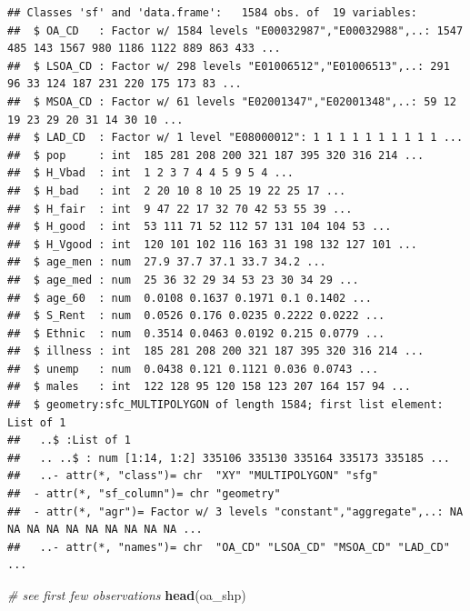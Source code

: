 \documentclass[]{book}
\newenvironment{Shaded}{\begin{snugshade}}{\end{snugshade}}
\newcommand{\CommentTok}[1]{\textcolor[rgb]{0.56,0.35,0.01}{\textit{#1}}}
\newcommand{\KeywordTok}[1]{\textcolor[rgb]{0.13,0.29,0.53}{\textbf{#1}}}
\newcommand{\NormalTok}[1]{#1}
\begin{document}
\begin{verbatim}
## Classes 'sf' and 'data.frame':   1584 obs. of  19 variables:
##  $ OA_CD   : Factor w/ 1584 levels "E00032987","E00032988",..: 1547 485 143 1567 980 1186 1122 889 863 433 ...
##  $ LSOA_CD : Factor w/ 298 levels "E01006512","E01006513",..: 291 96 33 124 187 231 220 175 173 83 ...
##  $ MSOA_CD : Factor w/ 61 levels "E02001347","E02001348",..: 59 12 19 23 29 20 31 14 30 10 ...
##  $ LAD_CD  : Factor w/ 1 level "E08000012": 1 1 1 1 1 1 1 1 1 1 ...
##  $ pop     : int  185 281 208 200 321 187 395 320 316 214 ...
##  $ H_Vbad  : int  1 2 3 7 4 4 5 9 5 4 ...
##  $ H_bad   : int  2 20 10 8 10 25 19 22 25 17 ...
##  $ H_fair  : int  9 47 22 17 32 70 42 53 55 39 ...
##  $ H_good  : int  53 111 71 52 112 57 131 104 104 53 ...
##  $ H_Vgood : int  120 101 102 116 163 31 198 132 127 101 ...
##  $ age_men : num  27.9 37.7 37.1 33.7 34.2 ...
##  $ age_med : num  25 36 32 29 34 53 23 30 34 29 ...
##  $ age_60  : num  0.0108 0.1637 0.1971 0.1 0.1402 ...
##  $ S_Rent  : num  0.0526 0.176 0.0235 0.2222 0.0222 ...
##  $ Ethnic  : num  0.3514 0.0463 0.0192 0.215 0.0779 ...
##  $ illness : int  185 281 208 200 321 187 395 320 316 214 ...
##  $ unemp   : num  0.0438 0.121 0.1121 0.036 0.0743 ...
##  $ males   : int  122 128 95 120 158 123 207 164 157 94 ...
##  $ geometry:sfc_MULTIPOLYGON of length 1584; first list element: List of 1
##   ..$ :List of 1
##   .. ..$ : num [1:14, 1:2] 335106 335130 335164 335173 335185 ...
##   ..- attr(*, "class")= chr  "XY" "MULTIPOLYGON" "sfg"
##  - attr(*, "sf_column")= chr "geometry"
##  - attr(*, "agr")= Factor w/ 3 levels "constant","aggregate",..: NA NA NA NA NA NA NA NA NA NA ...
##   ..- attr(*, "names")= chr  "OA_CD" "LSOA_CD" "MSOA_CD" "LAD_CD" ...
\end{verbatim}

\begin{Shaded}
\begin{Highlighting}[]
\CommentTok{# see first few observations}
\KeywordTok{head}\NormalTok{(oa_shp)}
\end{Highlighting}
\end{Shaded}
\end{document}
